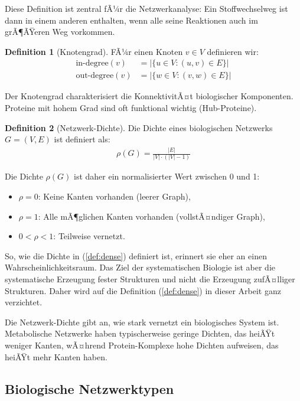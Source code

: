 ﻿\documentclass[a4paper,12pt]{article}
\theoremstyle{definition}
\newtheorem{definition}{Definition}
\begin{document}
Diese Definition ist zentral fÃ¼r die Netzwerkanalyse: Ein Stoffwechselweg ist dann in einem anderen enthalten, wenn alle seine Reaktionen auch im grÃ¶ÃŸeren Weg vorkommen.

\begin{definition}[Knotengrad]
	FÃ¼r einen Knoten $v \in V$ definieren wir:
	\begin{align*}
		\text{in-degree}(v) &= |\{u \in V : (u,v) \in E\}| \\
		\text{out-degree}(v) &= |\{w \in V : (v,w) \in E\}|
	\end{align*}
\end{definition}

Der Knotengrad charakterisiert die KonnektivitÃ¤t biologischer Komponenten. Proteine mit hohem Grad sind oft funktional wichtig (Hub-Proteine).

\begin{definition}[Netzwerk-Dichte]
	Die Dichte eines biologischen Netzwerks $G = (V,E)$ ist definiert als:
	\begin{align}
		\label{def:dense}
		\rho(G) = \frac{|E|}{|V| \cdot (|V|-1)}
	\end{align}
\end{definition}
Die Dichte $\rho(G)$ ist daher ein normalisierter Wert zwischen 0 und 1:
\begin{itemize}
	\item[-] $\rho = 0$: Keine Kanten vorhanden (leerer Graph),
	\item[-] $\rho = 1$: Alle mÃ¶glichen Kanten vorhanden (vollstÃ¤ndiger Graph),
	\item[-] $0 < \rho < 1$: Teilweise vernetzt.
\end{itemize}
So, wie die Dichte in (\ref{def:dense}) definiert ist, erinnert sie eher an einen Wahrscheinlichkeitsraum. Das Ziel der systematischen Biologie ist aber die systematische Erzeugung fester Strukturen und nicht die Erzeugung zufÃ¤lliger Strukturen. Daher wird auf die Definition (\ref{def:dense}) in dieser Arbeit ganz verzichtet. 

Die Netzwerk-Dichte gibt an, wie stark vernetzt ein biologisches System ist. Metabolische Netzwerke haben typischerweise geringe Dichten, das heiÃŸt weniger Kanten, wÃ¤hrend Protein-Komplexe hohe Dichten aufweisen, das heiÃŸt mehr Kanten haben.

\subsection{Biologische Netzwerktypen}
\end{document}
